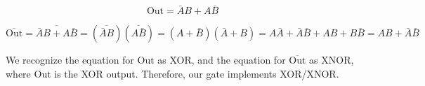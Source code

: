 \documentclass[fleqn]{article}
\begin{document}
\begin{enumerate}
\begin{enumerate}
			\begin{equation*}
				\text{Out} = \bar{A}B + A\bar{B}
			\end{equation*}
			
			\begin{equation*}
				\overline{\text{Out}} = \overline{\bar{A}B + A\bar{B}} = (\overline{\bar{A}B})(\overline{A\bar{B}}) = (A + \bar{B})(\bar{A} + B) = A\bar{A} + \bar{A}\bar{B} + AB + B\bar{B} = AB + \bar{A}\bar{B}
			\end{equation*}
			
			We recognize the equation for $\text{Out}$ as XOR, and the equation for $\overline{\text{Out}}$ as XNOR, where $\text{Out}$ is the XOR output. Therefore, our gate implements XOR/XNOR.
			
			\end{enumerate}			 
	\end{enumerate}
\end{document}
